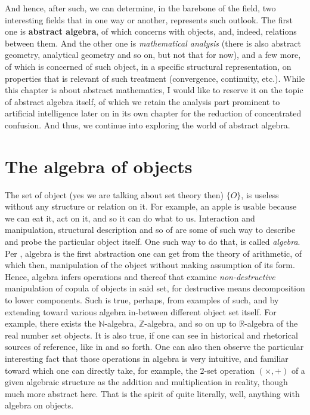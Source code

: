 And hence, after such, we can determine, in the barebone of the field, two interesting fields that in one way or another, represents such outlook. The first one is \textbf{abstract algebra}, of which concerns with objects, and, indeed, relations between them. And the other one is \textit{mathematical analysis} (there is also abstract geometry, analytical geometry and so on, but not that for now), and a few more, of which is concerned of such object, in a specific structural representation, on properties that is relevant of such treatment (convergence, continuity, etc.). While this chapter is about abstract mathematics, I would like to reserve it on the topic of abstract algebra itself, of which we retain the analysis part prominent to artificial intelligence later on in its own chapter for the reduction of concentrated confusion. And thus, we continue into exploring the world of abstract algebra. 

\section{The algebra of objects}

The set of object (yes we are talking about set theory then) $\{O\}$, is useless without any structure or relation on it. For example, an apple is usable because we can eat it, act on it, and so it can do what to us. Interaction and manipulation, structural description and so of are some of such way to describe and probe the particular object itself. One such way to do that, is called \textit{algebra}. Per \cite{sep-algebra-logic-tradition}, algebra is the first abstraction one can get from the theory of arithmetic, of which then, manipulation of the object without making assumption of its form. Hence, algebra infers operations and thereof that examine \textit{non-destructive} manipulation of copula of objects in said set, for destructive means decomposition to lower components. Such is true, perhaps, from examples of such, and by extending toward various algebra in-between different object set itself. For example, there exists the $\mathbb{N}$-algebra, $\mathbb{Z}$-algebra, and so on up to $\mathbb{R}$-algebra of the real number set objects. It is also true, if one can see in historical and rhetorical sources of reference, like in \cite{sep-algebra-logic-tradition,Boole_1854,Russell_1919,Rashed_2009,Boole_Everest_1909} and so forth. One can also then observe the particular interesting fact that those operations in algebra is very intuitive, and familiar toward which one can directly take, for example, the 2-set operation $(\times, +)$ of a given algebraic structure as the addition and multiplication in reality, though much more abstract here. That is the spirit of quite literally, well, anything with algebra on objects. 

